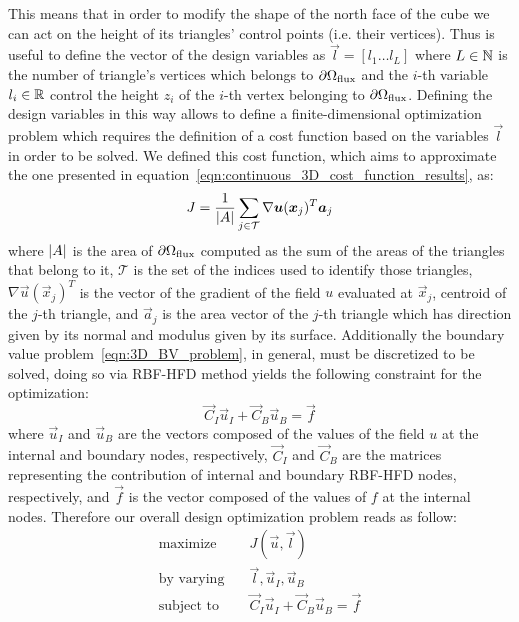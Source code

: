 This means that in order to modify the shape of the north face of the cube we can act on the height of its triangles' control points (i.e. their vertices). Thus is useful to define the vector of the design variables as $\vec{l} = [l_1 \dots l_L]$ where $L \in \mathbb{N}$ is the number of triangle's vertices which belongs to $\partial\Omega_\textup{flux}$ and the $i$-th variable $l_i \in \mathbb{R}$ control the height $z_i$ of the $i$-th vertex belonging to $\partial\Omega_\textup{flux}$. Defining the design variables in this way allows to define a finite-dimensional optimization problem which requires the definition of a cost function based on the variables $\vec{l}$ in order to be solved. We defined this cost function, which aims to approximate the one presented in equation~\eqref{eqn:continuous_3D_cost_function_results}, as:
\begin{equation}
	J = \frac{1}{\lvert A\rvert} \sum_{j \in \mathcal{T}} \nabla \boldsymbol{u}(\boldsymbol{x}_j)^T \boldsymbol{a}_j
\end{equation}
where $\lvert A\rvert$ is the area of $\partial\Omega_\textup{flux}$ computed as the sum of the areas of the triangles that belong to it, $\mathcal{T}$ is the set of the indices used to identify those triangles, $\nabla \vec{u}(\vec{x}_j)^T$ is the vector of the gradient of the field $u$ evaluated at $\vec{x}_j$, centroid of the $j$-th triangle, and $\vec{a}_j$ is the area vector of the $j$-th triangle which has direction given by its normal and modulus given by its surface.
Additionally the boundary value problem~\eqref{eqn:3D_BV_problem}, in general, must be discretized to be solved, doing so via RBF-HFD method yields the following constraint for the optimization:
\begin{equation}
	\label{eqn:3D_design_opt_constraint}
	\vec{C}_I\vec{u}_I + \vec{C}_B\vec{u}_B = \vec{f}
\end{equation}
where $\vec{u}_I$ and $\vec{u}_B$ are the vectors composed of the values of the field $u$ at the internal and boundary nodes, respectively, $\vec{C}_I$ and $ \vec{C}_B$ are the matrices representing the contribution of internal and boundary RBF-HFD nodes, respectively, and $\vec{f}$ is the vector composed of the values of $f$ at the internal nodes.
Therefore our overall design optimization problem reads as follow:
\begin{equation}
	\label{eqn:3D_design_opt_problem}
	\begin{aligned}
		\text{maximize} 		&  \quad J(\vec{u}, \vec{l})  									\\
		\text{by varying} 		&  \quad \vec{l}, \vec{u}_I, \vec{u}_B							\\
		\text{subject to}	 	&  \quad \vec{C}_I\vec{u}_I + \vec{C}_B\vec{u}_B = \vec{f}
	\end{aligned}
\end{equation}

